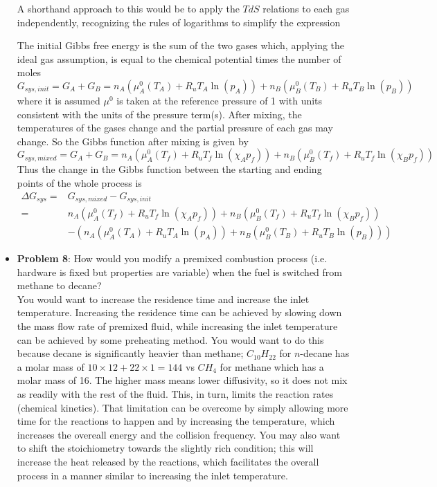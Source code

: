 \documentclass[11pt]{article}
\newcommand{\Item}[1]{\item \textbf{#1}:}
\newcommand{\CenteredBoxed}[1]{\begin{center}\boxed{#1}\end{center}}
\newcommand{\Problem}[1]{\Item{Problem #1}}
\begin{document}
\begin{itemize}
A shorthand approach to this would be to apply the $TdS$ relations to each gas independently, recognizing the rules of logarithms to simplify the expression
\CenteredBoxed{\Delta S = n_A\hat c_{V_A}\ln\left(\frac{T_f}{T_A}\right) + n_AR_u\ln\left(\frac{V_f}{V_A}\right) + n_B\hat c_{V_B}\ln\left(\frac{T_f}{T_B}\right) + n_BR_u\ln\left(\frac{V_f}{V_B}\right) + \frac{Q_{out}}{T_{ext}}}

The initial Gibbs free energy is the sum of the two gases which, applying the ideal gas assumption, is equal to the chemical potential times the number of moles
$$G_{sys,init} = G_A + G_B = n_A(\mu^0_A(T_A) + R_uT_A\ln(p_A)) + n_B(\mu^0_B(T_B)+R_uT_B\ln(p_B))$$
where it is assumed $\mu^0$ is taken at the reference pressure of 1 with units consistent with the units of the pressure term(s). After mixing, the temperatures of the gases change and the partial pressure of each gas may change. So the Gibbs function after mixing is given by
$$G_{sys,mixed} = G_A + G_B = n_A(\mu^0_A(T_f) + R_uT_f\ln(\chi_Ap_f)) + n_B(\mu^0_B(T_f) + R_uT_f\ln(\chi_Bp_f))$$
Thus the change in the Gibbs function between the starting and ending points of the whole process is
\begin{align*}
\Delta G_{sys} =& G_{sys,mixed} - G_{sys,init}\\
=& n_A(\mu^0_A(T_f) + R_uT_f\ln(\chi_Ap_f)) + n_B(\mu^0_B(T_f) + R_uT_f\ln(\chi_Bp_f))\\
&- \left(n_A(\mu^0_A(T_A) + R_uT_A\ln(p_A)) + n_B(\mu^0_B(T_B)+R_uT_B\ln(p_B))\right)
\end{align*} 

\Problem{8} How would you modify a premixed combustion process (i.e. hardware is fixed but properties are variable) when the fuel is switched from methane to decane?\\

You would want to increase the residence time and increase the inlet temperature. Increasing the residence time can be achieved by slowing down the mass flow rate of premixed fluid, while increasing the inlet temperature can be achieved by some preheating method. You would want to do this because decane is significantly heavier than methane; $C_{10}H_{22}$ for $n$-decane has a molar mass of $10\times12 + 22\times1 = 144$ vs $CH_4$ for methane which has a molar mass of 16. The higher mass means lower diffusivity, so it does not mix as readily with the rest of the fluid. This, in turn, limits the reaction rates (chemical kinetics). That limitation can be overcome by simply allowing more time for the reactions to happen and by increasing the temperature, which increases the overeall energy and the collision frequency. You may also want to shift the stoichiometry towards the slightly rich condition; this will increase the heat released by the reactions, which facilitates the overall process in a manner similar to increasing the inlet temperature.


\end{itemize}
\end{document}

